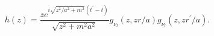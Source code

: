 \begin{equation}
h(z)=\frac{ze^{i\sqrt{z^{2}/a^{2}+m^{2}}(t^{\prime
}-t)}}{\sqrt{z^{2}+m^{2}a^{2}}}g_{\nu _{l} }(z,zr/a)g_{\nu _{l}
}(z,zr^{\prime }/a). \label{hab}
\end{equation}

